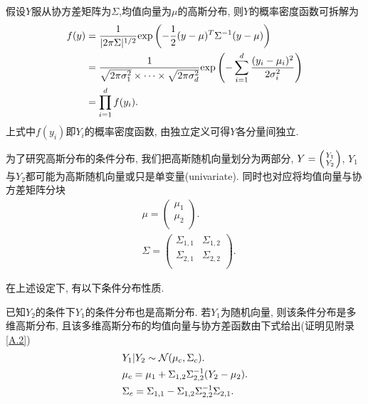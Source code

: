                 
                假设$Y$服从协方差矩阵为$\Sigma$,均值向量为$\mu$的高斯分布, 则$Y$的概率密度函数可拆解为
                \begin{align}
                    f(y)&=\frac{1}{|2\pi\Sigma|^{1/2}}\mathrm{exp}\left(-\frac{1}{2}(y-\mu)^{T}\Sigma^{-1}(y-\mu)\right) \notag \\
                    &=\frac{1}{\sqrt{2\pi\sigma^{2}_{1}}\times \dots\times\sqrt{2\pi\sigma^{2}_{d}}}\mathrm{exp}\left(-\sum^{d}_{i=1}\frac{(y_{i}-\mu_{i})^{2}}{2\sigma^{2}_{i}}\right) \notag \\
                    &=\prod^{d}_{i=1}f(y_{i}).
                \end{align}        
                上式中$f(y_{i})$即$Y_{i}$的概率密度函数, 由独立定义可得$Y$各分量间独立.

                为了研究高斯分布的条件分布, 我们把高斯随机向量划分为两部分, $Y=\left( {Y_{1}\atop Y_{2}}\right)$, $Y_{1}$与$Y_{2}$都可能为高斯随机向量或只是单变量(univariate). 同时也对应将均值向量与协方差矩阵分块
                \begin{align}
                    &\mu=   \begin{pmatrix}
                                    \mu_{1} \\ \mu_{2} \\
                            \end{pmatrix}.   \\
                    &\Sigma=\begin{pmatrix}\label{2.13}
                                \Sigma_{1,1} & \Sigma_{1,2} \\
                                \Sigma_{2,1} & \Sigma_{2,2} \\
                            \end{pmatrix}.
                \end{align}

                在上述设定下, 有以下条件分布性质.

                \begin{property}
                    已知$Y_{2}$的条件下$Y_{1}$的条件分布也是高斯分布. 若$Y_{1}$为随机向量, 则该条件分布是多维高斯分布, 且该多维高斯分布的均值向量与协方差函数由下式给出(证明见附录\ref{A.2})
                    \begin{align}
                        &Y_{1}|Y_{2}\sim\mathcal{N}(\mu_{c}, \Sigma_{c}). \notag \\
                        &\mu_{c}=\mu_{1}+\Sigma_{1,2}\Sigma_{2,2}^{-1}(Y_{2}-\mu_{2}). \label{muc}\\
                        &\Sigma_{c}=\Sigma_{1,1}-\Sigma_{1,2}\Sigma^{-1}_{2,2}\Sigma_{2,1}. \label{sigc}
                    \end{align}
                \end{property}

